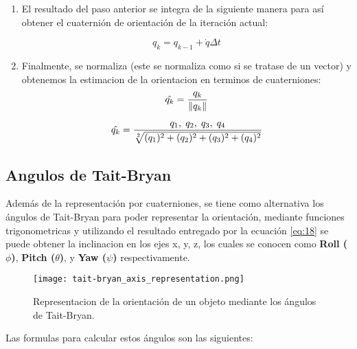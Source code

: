 \begin{enumerate}
        \item El resultado del paso anterior se integra de la siguiente manera para así obtener el cuaternión de orientación de la iteración actual:
        
        \begin{equation}
            q_k = q_{k-1} + \dot{q} \Delta t 
        \end{equation}
    
        \item Finalmente, se normaliza (este se normaliza como si se tratase de un vector) y obtenemos la estimacion de la orientacion en terminos de cuaterniones:
        \begin{equation}
            \hat{q_k} = \frac{q_k}{\lVert q_k\rVert} 
        \end{equation}        
            
        \begin{equation} \label{eq:18}
            \hat{q_k} = \frac{q_1, \hspace{1mm} q_2, \hspace{1mm} q_3, \hspace{1mm} q_4}{\sqrt[2]{(q_1)^2 + (q_2)^2 + (q_3)^2 + (q_4)^2}} 
        \end{equation}
            
    \end{enumerate}

    \subsection{Angulos de Tait-Bryan}

    Además de la representación por cuaterniones, se tiene como alternativa los ángulos de Tait-Bryan para poder representar la orientación, mediante funciones
    trigonometricas y utilizando el resultado entregado por la ecuación \ref{eq:18} se puede obtener la inclinacion en los ejes x, y, z, los cuales se conocen 
    como \textbf{Roll ($ \phi $)}, \textbf{Pitch ($ \theta  $)}, y \textbf{Yaw ($ \psi  $)} respectivamente.

    \begin{figure}[htp!]
        \centering
             \texttt{[image: tait-bryan\_axis\_representation.png]}
              \caption{Representacion de la orientación de un objeto mediante los ángulos de Tait-Bryan.}
    \end{figure}
    \FloatBarrier 

    Las formulas para calcular estos ángulos son las siguientes:

